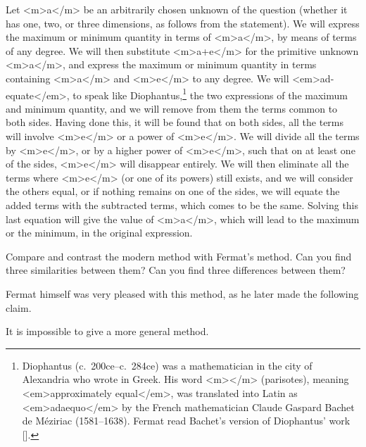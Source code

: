 \begin{refsection}
\begin{source}
  Let <m>a</m> be an arbitrarily chosen unknown of the question (whether it
  has one, two, or three dimensions, as follows from the statement).
  We will express the maximum or minimum quantity in terms of <m>a</m>, by
  means of terms of any degree.  We will then substitute <m>a+e</m> for the
  primitive unknown <m>a</m>, and express the maximum or minimum quantity
  in terms containing <m>a</m> and <m>e</m> to any degree.  We will
  <em>ad-equate</em>, to speak like Diophantus,\footnote{Diophantus
    (c.~200{\sc ce}--c.~284{\sc ce}) was a mathematician in the city
    of Alexandria who wrote in Greek.  His word
    <m>\pi\alpha\rho\iota\sigma{}\tau\eta\zeta</m> (parisotes),
    meaning <em>approximately equal</em>, was translated into Latin as
    <em>adaequo</em> by the French mathematician Claude Gaspard Bachet
    de M\'{e}ziriac (1581--1638).  Fermat read Bachet's version of
    Diophantus' work [\cite{KatzAndFriends}].} the two expressions of
  the maximum and minimum quantity, and we will remove from them the
  terms common to both sides.  Having done this, it will be found that
  on both sides, all the terms will involve <m>e</m> or a power of <m>e</m>.  We
  will divide all the terms by <m>e</m>, or by a higher power of <m>e</m>, such
  that on at least one of the sides, <m>e</m> will disappear entirely.  We
  will then eliminate all the terms where <m>e</m> (or one of its powers)
  still exists, and we will consider the others equal, or if nothing
  remains on one of the sides, we will equate the added terms with the
  subtracted terms, which comes to be the same.  Solving this last
  equation will give the value of <m>a</m>, which will lead to the maximum
  or the minimum, in the original expression.

\end{source}

\begin{task}
  Compare and contrast the modern method with Fermat's method.  Can
  you find three similarities between them?  Can you find three
  differences between them?
 \end{task}

 Fermat himself was very pleased with this method, as he later made
 the following claim.

 \begin{source}
   It is impossible to give a more general method.
 \end{source}


\end{refsection}
